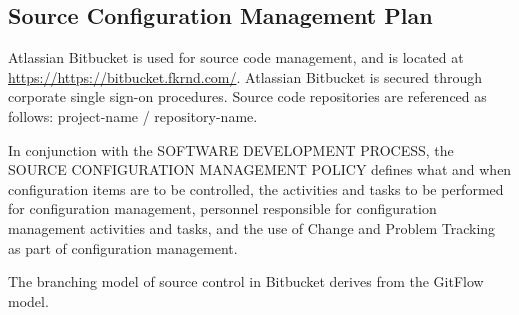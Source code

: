 \subsection{Source Configuration Management Plan}

Atlassian Bitbucket is used for source code management, and is located at
\url{https://https://bitbucket.fkrnd.com/}. Atlassian Bitbucket is secured
through corporate single sign-on procedures. Source code repositories are
referenced as follows: project-name / repository-name.

In conjunction with the SOFTWARE DEVELOPMENT PROCESS, the SOURCE CONFIGURATION
MANAGEMENT POLICY defines what and when configuration items are to be
controlled, the activities and tasks to be performed for configuration
management, personnel responsible for configuration management activities and
tasks, and the use of Change and Problem Tracking as part of configuration
management.

\tlcVspace

The branching model of source control in Bitbucket derives from the GitFlow
model.

